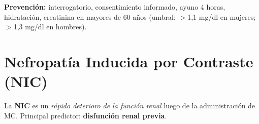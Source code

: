 \textbf{Prevención:} interrogatorio, consentimiento informado, ayuno 4 horas, hidratación, creatinina en mayores de 60 años (umbral: $>$1,1 mg/dl en mujeres; $>$1,3 mg/dl en hombres).

\clearpage

\section*{Nefropatía Inducida por Contraste (NIC)}

\begin{cajadefinicion}
La \textbf{NIC} es un \textit{rápido deterioro de la función renal} luego de la administración de MC. Principal predictor: \textbf{disfunción renal previa}.
\end{cajadefinicion}

